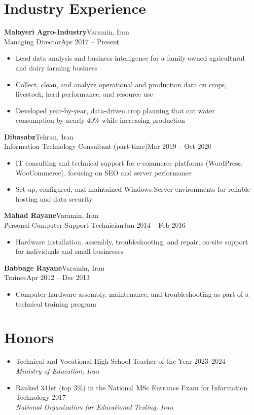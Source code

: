 \documentclass[10pt]{article}
\newcommand{\entry}[4]{\needspace{4\baselineskip}\textbf{#1}\hfill #2\\#3\hfill #4\par}
\newenvironment{dashes}{\begin{itemize}[label=--,leftmargin=2.2em,topsep=1pt,itemsep=0pt,parsep=0pt]}{\end{itemize}}
\newenvironment{bullets}{\begin{itemize}[leftmargin=1.2em,topsep=1pt,itemsep=1pt,parsep=0pt]}{\end{itemize}}
\newcommand{\gap}{\vspace{3pt}}
\begin{document}
\section{Industry Experience}
\entry{Malayeri Agro-Industry}{Varamin, Iran}{Managing Director}{Apr 2017 -- Present}
\begin{dashes}
\item Lead data analysis and business intelligence for a family-owned agricultural and dairy farming business
\item Collect, clean, and analyze operational and production data on crops, livestock, herd performance, and resource use
\item Developed year-by-year, data-driven crop planning that cut water consumption by nearly 40\% while increasing production
\end{dashes}
\gap
\entry{Dibasabz}{Tehran, Iran}{Information Technology Consultant (part-time)}{Mar 2019 -- Oct 2020}
\begin{dashes}
\item IT consulting and technical support for e-commerce platforms (WordPress, WooCommerce), focusing on SEO and server performance
\item Set up, configured, and maintained Windows Server environments for reliable hosting and data security
\end{dashes}
\gap
\entry{Mahad Rayane}{Varamin, Iran}{Personal Computer Support Technician}{Jan 2014 -- Feb 2016}
\begin{dashes}
\item Hardware installation, assembly, troubleshooting, and repair; on-site support for individuals and small businesses
\end{dashes}
\gap
\entry{Babbage Rayane}{Varamin, Iran}{Trainee}{Apr 2012 -- Dec 2013}
\begin{dashes}
\item Computer hardware assembly, maintenance, and troubleshooting as part of a technical training program
\end{dashes}

\section{Honors}
\begin{bullets}
\item Technical and Vocational High School Teacher of the Year \hfill 2023--2024\\ \textit{Ministry of Education, Iran}
\item Ranked 341st (top 3\%) in the National MSc Entrance Exam for Information Technology \hfill 2017\\ \textit{National Organization for Educational Testing, Iran}
\end{bullets}
\end{document}
